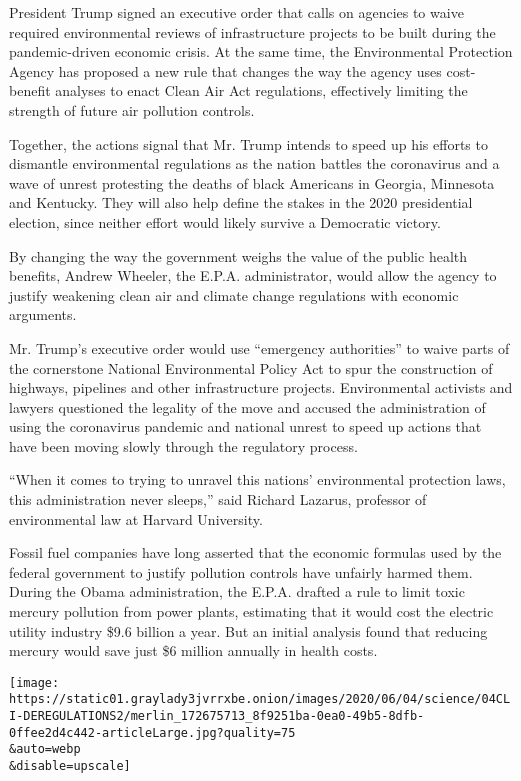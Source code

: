 President Trump signed an executive order that calls on agencies to
waive required environmental reviews of infrastructure projects to be
built during the pandemic-driven economic crisis. At the same time, the
Environmental Protection Agency has proposed a new rule that changes the
way the agency uses cost-benefit analyses to enact Clean Air Act
regulations, effectively limiting the strength of future air pollution
controls.

Together, the actions signal that Mr. Trump intends to speed up his
efforts to dismantle environmental regulations as the nation battles the
coronavirus and a wave of unrest protesting the deaths of black
Americans in Georgia, Minnesota and Kentucky. They will also help define
the stakes in the 2020 presidential election, since neither effort would
likely survive a Democratic victory.

By changing the way the government weighs the value of the public health
benefits, Andrew Wheeler, the E.P.A. administrator, would allow the
agency to justify weakening clean air and climate change regulations
with economic arguments.

Mr. Trump's executive order would use ``emergency authorities'' to waive
parts of the cornerstone National Environmental Policy Act to spur the
construction of highways, pipelines and other infrastructure projects.
Environmental activists and lawyers questioned the legality of the move
and accused the administration of using the coronavirus pandemic and
national unrest to speed up actions that have been moving slowly through
the regulatory process.

``When it comes to trying to unravel this nations' environmental
protection laws, this administration never sleeps,'' said Richard
Lazarus, professor of environmental law at Harvard University.

Fossil fuel companies have long asserted that the economic formulas used
by the federal government to justify pollution controls have unfairly
harmed them. During the Obama administration, the E.P.A. drafted a rule
to limit toxic mercury pollution from power plants, estimating that it
would cost the electric utility industry \$9.6 billion a year. But an
initial analysis found that reducing mercury would save just \$6 million
annually in health costs.

\texttt{[image: https://static01.graylady3jvrrxbe.onion/images/2020/06/04/science/04CLI-DEREGULATIONS2/merlin\_172675713\_8f9251ba-0ea0-49b5-8dfb-0ffee2d4c442-articleLarge.jpg?quality=75\\\&auto=webp\\\&disable=upscale]}

